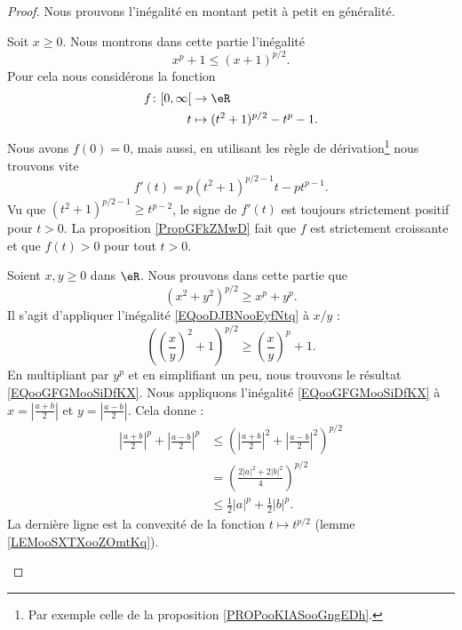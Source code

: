 \begin{proof}
	Nous prouvons l'inégalité en montant petit à petit en généralité.
	\begin{subproof}
		\spitem[Avec \( x>0\)]
		Soit \( x\geq 0\). Nous montrons dans cette partie l'inégalité
		\begin{equation}        \label{EQooDJBNooEyfNtq}
			x^p+1\leq (x+1)^{p/2}.
		\end{equation}
		Pour cela nous considérons la fonction
		\begin{equation}
			\begin{aligned}
				f\colon \mathopen[ 0 , \infty \mathclose[ & \to \eR                      \\
				t                                         & \mapsto (t^2+1)^{p/2}-t^p-1.
			\end{aligned}
		\end{equation}
		Nous avons \( f(0)=0\), mais aussi, en utilisant les règle de dérivation\footnote{Par exemple celle de la proposition \ref{PROPooKIASooGngEDh}.} nous trouvons vite
		\begin{equation}
			f'(t)=p(t^2+1)^{p/2-1}t-pt^{p-1}.
		\end{equation}
		Vu que \( (t^2+1)^{p/2-1}\geq t^{p-2}\), le signe de \( f'(t)\) est toujours strictement positif pour \( t>0\). La proposition \ref{PropGFkZMwD} fait que \( f\) est strictement croissante et que \( f(t)>0\) pour tout \( t>0\).

		Soient \( x,y\geq 0\) dans \( \eR\). Nous prouvons dans cette partie que
		\begin{equation}        \label{EQooGFGMooSiDfKX}
			(x^2+y^2)^{p/2}\geq x^p+y^p.
		\end{equation}
		Il s'agit d'appliquer l'inégalité \eqref{EQooDJBNooEyfNtq} à \( x/y\) :
		\begin{equation}
			\left( \left( \frac{ x }{ y } \right)^2+1 \right)^{p/2}\geq \left( \frac{ x }{ y } \right)^p+1.
		\end{equation}
		En multipliant par \( y^p\) et en simplifiant un peu, nous trouvons le résultat \eqref{EQooGFGMooSiDfKX}.
		\spitem[Avec \( a,b\in \eC\)]
		Nous appliquons l'inégalité \eqref{EQooGFGMooSiDfKX} à \( x=| \frac{ a+b }{ 2 } |\) et \( y=| \frac{ a-b }{2} |\). Cela donne :
		\begin{subequations}
			\begin{align}
				\left| \frac{ a+b }{2} \right|^p+\left| \frac{ a-b }{2} \right|^p & \leq \left( \left| \frac{ a+b }{2} \right|^2+\left| \frac{ a-b }{2} \right|^2 \right)^{p/2} \\
				                                                                  & =\left( \frac{ 2| a |^2+2| b |^2 }{ 4 } \right)^{p/2}                                       \\
				                                                                  & \leq\frac{ 1 }{2}| a |^p+\frac{ 1 }{2}| b |^p.
			\end{align}
		\end{subequations}
		La dernière ligne est la convexité de la fonction \( t\mapsto t^{p/2}\) (lemme \ref{LEMooSXTXooZOmtKq}).
	\end{subproof}
\end{proof}

